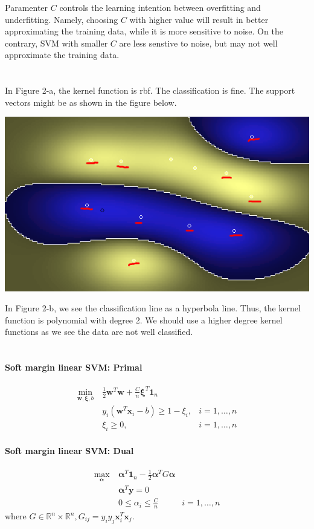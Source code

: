 \documentclass{article}[11pt]
\begin{document}
Paramenter $C$ controls the learning intention between overfitting and underfitting. Namely, choosing $C$ with higher value will result in better approximating the training data, while it is more sensitive to noise. On the contrary, SVM with smaller $C$ are less senstive to noise, but may not well approximate the training data.

\section{}
In Figure 2-a, the kernel function is rbf. The classification is fine. The support vectors might be as shown in the figure below.
\begin{center}
  \includegraphics[width=.7\textwidth]{ex2-support-vectors}
\end{center}

In Figure 2-b, we see the classification line as a hyperbola line. Thus, the kernel function is polynomial with degree 2. We should use a higher degree kernel functions as we see the data are not well classified.

\section{}
\paragraph{Soft margin linear SVM: Primal}
\begin{align*}
  \min_{\mathbf{w}, \boldsymbol{\xi}, b} ~& \frac{1}{2} \mathbf{w}^T\mathbf{w} + \frac{C}{n} \boldsymbol{\xi}^T\mathbf{1}_n & \\
  & y_i(\mathbf{w}^T \mathbf{x}_i - b) \ge 1 - \xi_i,& i = 1, \dots, n \\
  & \xi_i \ge 0,& i = 1, \dots, n
\end{align*}

\paragraph{Soft margin linear SVM: Dual}
\begin{align*}
  \max_{\boldsymbol{\alpha}} ~& \boldsymbol{\alpha}^T \mathbf{1}_n - \frac{1}{2} \boldsymbol{\alpha}^T G \boldsymbol{\alpha} & \\
  & \boldsymbol{\alpha}^T \mathbf{y} = 0 & \\
  & 0 \le \alpha_i \le \frac{C}{n} & i = 1, \dots, n
\end{align*}
where $G \in \mathbb{R}^n \times \mathbb{R}^n, G_{ij} = y_i y_j \mathbf{x}_i^T \mathbf{x}_j$.
\end{document}
